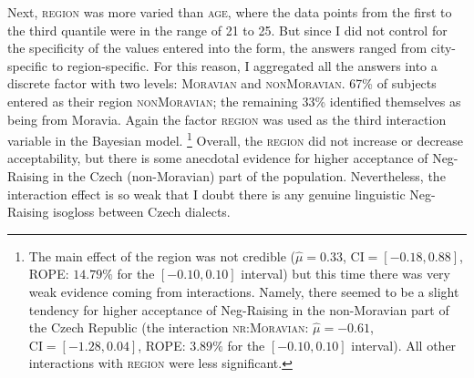 \documentclass[output=paper,colorlinks,citecolor=brown]{langscibook}
\begin{document}
Next, \textsc{region} was more varied than \textsc{age}, where the data points from the first to the third quantile were in the range of 21 to 25. But since I did not control for the specificity of the values entered into the form, the answers ranged from city-specific to region-specific. For this reason, I aggregated all the answers into a discrete factor with two levels: \textsc{Moravian} and \textsc{nonMoravian}. 67\% of subjects entered as their region \textsc{nonMoravian}; the remaining 33\% identified themselves as being from Moravia. Again the factor \textsc{region} was used as the third interaction variable in the Bayesian model.%
\footnote{The main effect of the region was not credible ($\hat{\mu}=0.33$, $\mathrm{CI}=[-0.18,  0.88]$, ROPE: $14.79\%$ for the $[-0.10, 0.10]$ interval) but this time there was very weak evidence coming from interactions. Namely, there seemed to be a slight tendency for higher acceptance of Neg-Raising in the non-Moravian part of the Czech Republic (the interaction \textsc{nr:Moravian}: $\hat{\mu}=-0.61$, $\mathrm{CI}=[-1.28,  0.04]$, ROPE: $3.89\%$ for the $[-0.10, 0.10]$ interval). All other interactions with \textsc{region} were less significant.}
Overall, the \textsc{region} did not increase or decrease acceptability, but there is some anecdotal evidence for higher acceptance of Neg-Raising in the Czech (non-Moravian) part of the population. Nevertheless, the interaction effect is so weak that I doubt there is any genuine linguistic Neg-Raising isogloss between Czech dialects.
\end{document}
